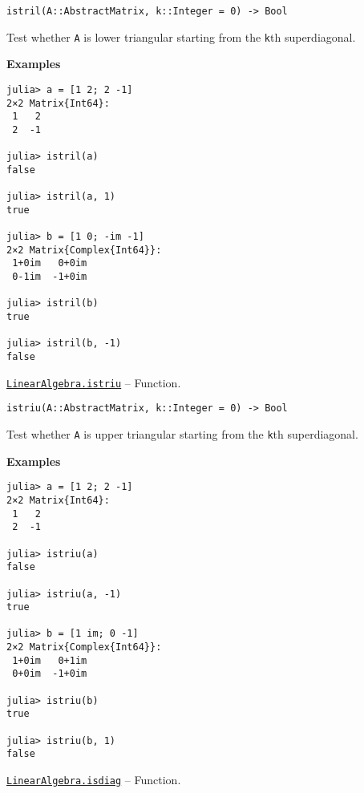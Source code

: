 \begin{adjustwidth}{2em}{0pt}


\begin{verbatim}
istril(A::AbstractMatrix, k::Integer = 0) -> Bool
\end{verbatim}

Test whether \texttt{A} is lower triangular starting from the \texttt{k}th superdiagonal.

\textbf{Examples}


\begin{verbatim}
julia> a = [1 2; 2 -1]
2×2 Matrix{Int64}:
 1   2
 2  -1

julia> istril(a)
false

julia> istril(a, 1)
true

julia> b = [1 0; -im -1]
2×2 Matrix{Complex{Int64}}:
 1+0im   0+0im
 0-1im  -1+0im

julia> istril(b)
true

julia> istril(b, -1)
false
\end{verbatim}



\end{adjustwidth}
\hypertarget{15000310211103088559}{}
\hyperlink{15000310211103088559}{\texttt{LinearAlgebra.istriu}}  -- {Function.}

\begin{adjustwidth}{2em}{0pt}


\begin{verbatim}
istriu(A::AbstractMatrix, k::Integer = 0) -> Bool
\end{verbatim}

Test whether \texttt{A} is upper triangular starting from the \texttt{k}th superdiagonal.

\textbf{Examples}


\begin{verbatim}
julia> a = [1 2; 2 -1]
2×2 Matrix{Int64}:
 1   2
 2  -1

julia> istriu(a)
false

julia> istriu(a, -1)
true

julia> b = [1 im; 0 -1]
2×2 Matrix{Complex{Int64}}:
 1+0im   0+1im
 0+0im  -1+0im

julia> istriu(b)
true

julia> istriu(b, 1)
false
\end{verbatim}



\end{adjustwidth}
\hypertarget{13562995326026471446}{}
\hyperlink{13562995326026471446}{\texttt{LinearAlgebra.isdiag}}  -- {Function.}

